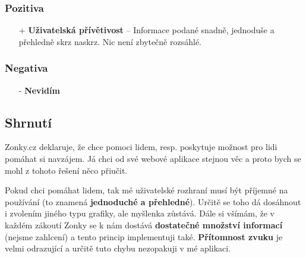 \subsubsection*{Pozitiva}
\begin{itemize}
    \item[+] \textbf{Uživatelská přívětivost} -- Informace podané snadně, jednoduše a přehledně skrz naskrz. Nic není zbytečně rozsáhlé.
\end{itemize}
\subsubsection*{Negativa}
\begin{itemize}
    \item[-] \textbf{Nevidím}
\end{itemize}



\newpage
\subsection{Shrnutí}
Zonky.cz deklaruje, že chce pomoci lidem, resp. poskytuje možnost pro lidi pomáhat si navzájem. Já chci od své webové aplikace stejnou věc a proto bych se mohl z tohoto řešení něco přiučit.

Pokud chci pomáhat lidem, tak mé uživatelské rozhraní musí být příjemné na používání (to znamená \textbf{jednoduché a přehledné}). Určitě se toho dá dosáhnout i zvolením jiného typu grafiky, ale myšlenka zůstává. Dále si všímám, že v každém zákoutí Zonky se k nám dostává \textbf{dostatečné množství informací} (nejsme zahlcení) a tento princip implementuji také. \textbf{Přítomnost zvuku} je velmi odrazující a určitě tuto chybu nezopakuji v mé aplikaci.